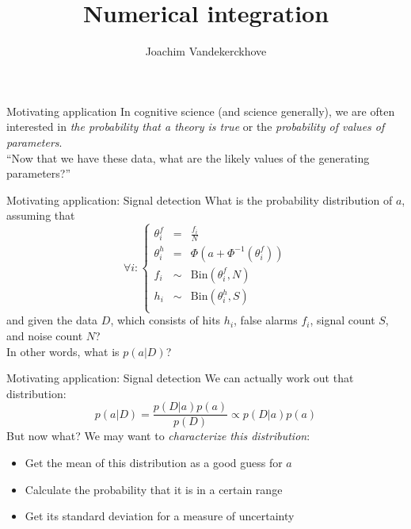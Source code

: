 \documentclass{beamer}
\author{Joachim Vandekerckhove}
\date{}
\begin{document}
\title{Numerical integration}
\begin{frame}
  \maketitle
\end{frame}

\begin{frame}{Motivating application}
In cognitive science (and science generally), we are often interested in \emph{the probability that a theory is true} or the \emph{probability of values of parameters}.\\[2ex]

``Now that we have these data, what are the likely values of the generating parameters?''
\end{frame}


\begin{frame}[fragile]{Motivating application: Signal detection}
What is the probability distribution of $a$, assuming that
$$
\forall i: 
\left\{
\begin{array}{rcl}
\theta^f_i & = & \frac{f_i}{N}\\
\theta^h_i & = & \Phi\left(a + \Phi^{-1}\!\left(\theta^f_i\right)\right)\\
f_i &\sim& \text{Bin}\left(\theta^f_i, N\right)\\
h_i &\sim& \text{Bin}\left(\theta^h_i, S\right)\\
\end{array}
\right.
$$
and given the data $D$, which consists of hits $h_i$, false alarms $f_i$, signal count $S$, and noise count $N$?\\[2ex]
In other words, what is $p\left(a | D\right)$?
\end{frame}

\begin{frame}{Motivating application: Signal detection}
We can actually work out that distribution:
$$
p\left(a | D\right) = \frac{p\left(D|a\right)p\left(a\right)}{p\left(D\right)} \propto p\left(D|a\right)p\left(a\right)
$$
But now what?  We may want to \emph{characterize this distribution}:
\begin{itemize}
\item Get the mean of this distribution as a good guess for $a$
\item Calculate the probability that it is in a certain range
\item Get its standard deviation for a measure of uncertainty
\end{itemize}
\end{frame}
\end{document}
